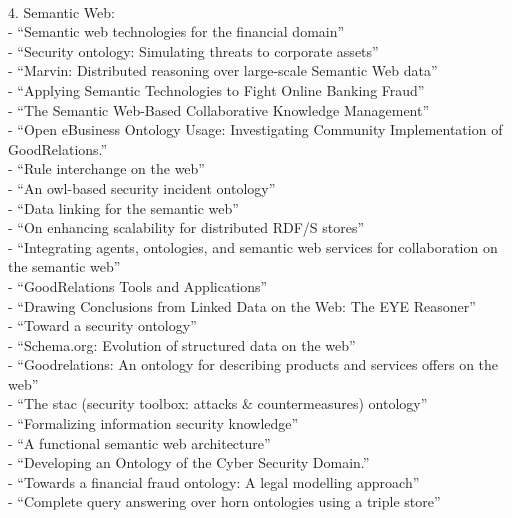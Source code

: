 \\
4. Semantic Web: \\
- ``Semantic web technologies for the financial domain'' \citep{lara2007semantic} \\
- ``Security ontology: Simulating threats to corporate assets'' \citep{ekelhart2006security} \\
- ``Marvin: Distributed reasoning over large-scale Semantic Web data'' \citep{oren2009marvin} \\
- ``Applying Semantic Technologies to Fight Online Banking Fraud'' \citep{carvalhoapplying} \\
- ``The Semantic Web-Based Collaborative Knowledge Management'' \citep{chao2012semantic} \\
- ``Open eBusiness Ontology Usage: Investigating Community Implementation of GoodRelations.'' \citep{ashraf2011open} \\
- ``Rule interchange on the web'' \citep{boley2007rule} \\
- ``An owl-based security incident ontology'' \citep{martimiano2005owl} \\
- ``Data linking for the semantic web'' \citep{scharffe2011data} \\
- ``On enhancing scalability for distributed RDF/S stores'' \citep{tsatsanifos2011enhancing} \\
- ``Integrating agents, ontologies, and semantic web services for collaboration on the semantic web'' \citep{stollberg2005integrating} \\
- ``GoodRelations Tools and Applications'' \citep{hepp2009goodrelations} \\
- ``Drawing Conclusions from Linked Data on the Web: The EYE Reasoner'' \citep{verborgh2015drawing} \\
- ``Toward a security ontology'' \citep{donner2003toward} \\
- ``Schema.org: Evolution of structured data on the web'' \citep{guha2016schema} \\
- ``Goodrelations: An ontology for describing products and services offers on the web'' \citep{hepp2008goodrelations} \\
- ``The stac (security toolbox: attacks \& countermeasures) ontology'' \citep{gyrard2013stac} \\
- ``Formalizing information security knowledge'' \citep{fenz2009formalizing} \\
- ``A functional semantic web architecture'' \citep{gerber2008functional} \\
- ``Developing an Ontology of the Cyber Security Domain.'' \citep{obrst2012developing} \\
- ``Towards a financial fraud ontology: A legal modelling approach'' \citep{kingston2004towards} \\
- ``Complete query answering over horn ontologies using a triple store'' \citep{zhou2013complete} \\

